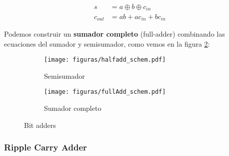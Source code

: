 \begin{subequations}
\begin{align}
s &= a\oplus b \oplus c_{in}
\label{s}
\\
c_{out}&= a b + a c_{in} + b c_{in}
\label{c}
\end{align}
\end{subequations}

Podemos construir un {\bf sumador completo} (full-adder) combinando las ecuaciones del sumador y semisumador, como vemos en la figura \ref{fig:fulladder}:

\vspace{-1pt}

\begin{figure}[h]
  \centering
\hspace{-23pt}
\begin{subfigure}[b]{0.3\textwidth}
                \centering
                \texttt{[image: figuras/halfadd\_schem.pdf]}
                \caption{Semisumador}
                \label{fig:halfadder}
        \end{subfigure}
\begin{subfigure}[b]{0.5\textwidth}
                \centering
                \texttt{[image: figuras/fullAdd\_schem.pdf]}
                \caption{Sumador completo}
                \label{fig:fulladder}
        \end{subfigure}

  \caption{Bit adders}\label{fig:bitadders}

\end{figure}

\vspace{0.5cm}


\subsubsection{Ripple Carry Adder}

